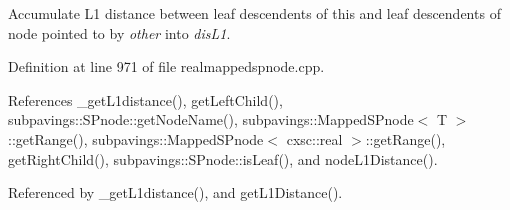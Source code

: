 \-Accumulate \-L1 distance between leaf descendents of this and leaf descendents of node pointed to by {\itshape other\/} into {\itshape dis\-L1\/}. 



\-Definition at line 971 of file realmappedspnode.\-cpp.



\-References \-\_\-get\-L1distance(), get\-Left\-Child(), subpavings\-::\-S\-Pnode\-::get\-Node\-Name(), subpavings\-::\-Mapped\-S\-Pnode$<$ T $>$\-::get\-Range(), subpavings\-::\-Mapped\-S\-Pnode$<$ cxsc\-::real $>$\-::get\-Range(), get\-Right\-Child(), subpavings\-::\-S\-Pnode\-::is\-Leaf(), and node\-L1\-Distance().



\-Referenced by \-\_\-get\-L1distance(), and get\-L1\-Distance().


